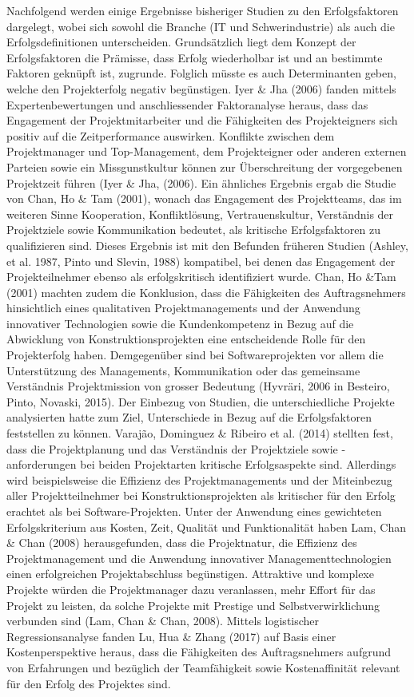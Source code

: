 Nachfolgend werden einige Ergebnisse bisheriger Studien zu den Erfolgsfaktoren dargelegt, wobei sich sowohl die Branche (IT und Schwerindustrie) als auch die Erfolgsdefinitionen unterscheiden. Grundsätzlich liegt dem Konzept der Erfolgsfaktoren die Prämisse, dass Erfolg wiederholbar ist und an bestimmte Faktoren geknüpft ist, zugrunde. Folglich müsste es auch Determinanten geben, welche den Projekterfolg negativ begünstigen. Iyer \& Jha (2006) fanden mittels Expertenbewertungen und anschliessender Faktoranalyse heraus, dass das Engagement der Projektmitarbeiter und die Fähigkeiten des Projekteigners sich positiv auf die Zeitperformance auswirken. Konflikte zwischen dem Projektmanager und Top-Management, dem Projekteigner oder anderen externen Parteien sowie ein Missgunstkultur können zur Überschreitung der vorgegebenen Projektzeit führen (Iyer \& Jha, (2006). Ein ähnliches Ergebnis ergab die Studie von Chan, Ho \& Tam (2001), wonach das Engagement des Projektteams, das im weiteren Sinne Kooperation, Konfliktlösung, Vertrauenskultur, Verständnis der Projektziele sowie Kommunikation bedeutet, als kritische Erfolgsfaktoren zu qualifizieren sind. Dieses Ergebnis ist mit den Befunden früheren Studien (Ashley, et al. 1987, Pinto und Slevin, 1988) kompatibel, bei denen das Engagement der Projekteilnehmer ebenso als erfolgskritisch identifiziert wurde. Chan, Ho \&Tam (2001) machten zudem die Konklusion, dass die Fähigkeiten des Auftragsnehmers hinsichtlich eines qualitativen Projektmanagements und der Anwendung innovativer Technologien sowie die Kundenkompetenz in Bezug auf die Abwicklung von Konstruktionsprojekten eine entscheidende Rolle für den Projekterfolg haben. Demgegenüber sind bei Softwareprojekten vor allem die Unterstützung des Managements, Kommunikation oder das gemeinsame Verständnis Projektmission von grosser Bedeutung (Hyvräri, 2006 in Besteiro, Pinto, Novaski, 2015). Der Einbezug von Studien, die unterschiedliche Projekte analysierten hatte zum Ziel, Unterschiede in Bezug auf die Erfolgsfaktoren feststellen zu können. Varajão, Dominguez \& Ribeiro et al. (2014) stellten fest, dass die Projektplanung und das Verständnis der Projektziele sowie -anforderungen bei beiden Projektarten kritische Erfolgsaspekte sind. Allerdings wird beispielsweise die Effizienz des Projektmanagements und der Miteinbezug aller Projektteilnehmer bei Konstruktionsprojekten als kritischer für den Erfolg erachtet als bei Software-Projekten. Unter der Anwendung eines gewichteten Erfolgskriterium aus Kosten, Zeit, Qualität und Funktionalität haben Lam, Chan \& Chan (2008) herausgefunden, dass die Projektnatur, die Effizienz des Projektmanagement und die Anwendung innovativer Managementtechnologien einen erfolgreichen Projektabschluss begünstigen. Attraktive und komplexe Projekte würden die Projektmanager dazu veranlassen, mehr Effort für das Projekt zu leisten, da solche Projekte mit Prestige und Selbstverwirklichung verbunden sind (Lam, Chan \& Chan, 2008). Mittels logistischer Regressionsanalyse fanden Lu, Hua \& Zhang (2017) auf Basis einer Kostenperspektive heraus, dass die Fähigkeiten des Auftragsnehmers aufgrund von Erfahrungen und bezüglich der Teamfähigkeit sowie Kostenaffinität relevant für den Erfolg des Projektes sind. 
